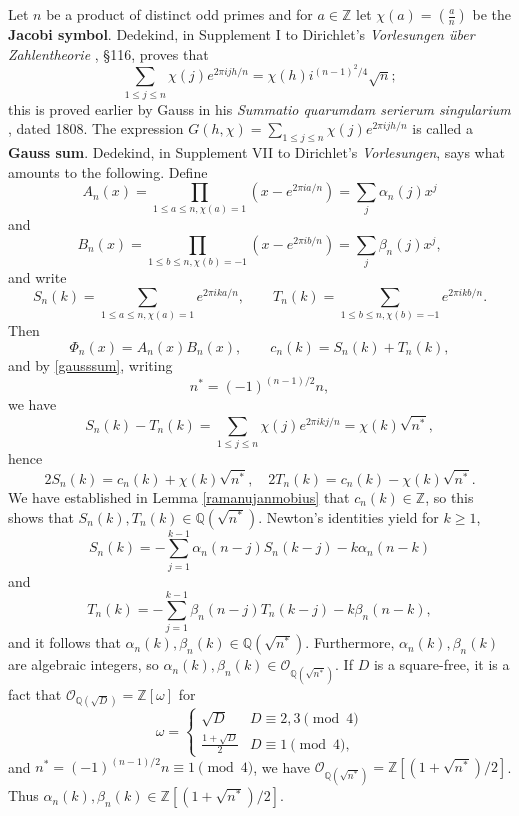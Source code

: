 \documentclass{amsart}
\theoremstyle{definition}
\begin{document}
Let $n$ be a product of distinct odd primes and for $a \in \mathbb{Z}$ let $\chi(a) = \left( \frac{a}{n}\right)$ be the \textbf{Jacobi symbol}. 
Dedekind, in Supplement I to Dirichlet's {\em Vorlesungen \"uber Zahlentheorie}  \cite[pp.~208--210]{dirichlet}, \S 116, proves that
\begin{equation}
\sum_{1 \leq j \leq n} \chi(j) e^{2\pi ij h/n} = \chi(h) i^{(n-1)^2/4} \sqrt{n};
\label{gausssum}
\end{equation}
this is proved earlier by 
Gauss in his {\em Summatio quarumdam serierum singularium} \cite[pp.~9--45]{gaussII}, dated 1808.
The expression $G(h,\chi)=\sum_{1 \leq j \leq n} \chi(j) e^{2\pi ij h/n}$ is called a \textbf{Gauss sum}.
Dedekind, in Supplement VII to Dirichlet's {\em Vorlesungen}, says what amounts to
the following.
Define
\[
A_n(x) = \prod_{1 \leq a \leq n, \chi(a)=1} (x-e^{2\pi ia/n}) = \sum_j \alpha_n(j) x^j
\] 
and
\[
B_n(x) = \prod_{1 \leq b \leq n, \chi(b)=-1} (x-e^{2\pi ib/n}) = \sum_j \beta_n(j) x^j,
\]
and write
\[
S_n(k) =  \sum_{1 \leq a \leq n, \chi(a)=1} e^{2\pi ik a/n},
\qquad T_n(k) = \sum_{1 \leq b \leq n, \chi(b)=-1} e^{2\pi ik b/n}.
\]
Then
\[
\Phi_n(x) = A_n(x) B_n(x),\qquad c_n(k) = S_n(k) + T_n(k),
\]
and by \eqref{gausssum}, writing
\[
n^*=(-1)^{(n-1)/2} n,
\]
we have
\[
S_n(k) - T_n(k) =\sum_{1 \leq j \leq n} \chi(j) e^{2\pi ik j/n} = \chi(k)  \sqrt{n^*},
\]
hence
\[
2S_n(k) = c_n(k) +  \chi(k)   \sqrt{n^*},
\quad
2T_n(k) = c_n(k) -  \chi(k)  \sqrt{n^*}.
\]
We have  established in Lemma \ref{ramanujanmobius} that $c_n(k) \in \mathbb{Z}$, so this shows that
$S_n(k), T_n(k) \in \mathbb{Q}(\sqrt{n^*})$.
Newton's identities yield for $k \geq 1$,
\[
S_n(k) = -\sum_{j=1}^{k-1}  \alpha_n(n-j) S_n(k-j) - k\alpha_n(n-k)
\]
and
\[
T_n(k) = -\sum_{j=1}^{k-1}  \beta_n(n-j) T_n(k-j) - k\beta_n(n-k),
\]
and it follows that $\alpha_n(k),\beta_n(k) \in \mathbb{Q}( \sqrt{n^*})$.
Furthermore, $\alpha_n(k),\beta_n(k)$ are algebraic integers, so
$\alpha_n(k),\beta_n(k) \in \mathcal{O}_{\mathbb{Q}(\sqrt{n^*})}$. 
If $D$ is a square-free, it is a fact \cite[p.~698, \S 15.3]{dummit} that 
$\mathcal{O}_{\mathbb{Q}(\sqrt{D})} = \mathbb{Z}[\omega]$ for 
\[
\omega = \begin{cases}
\sqrt{D}&D \equiv 2,3 \pmod{4}\\
\frac{1+\sqrt{D}}{2}&D \equiv 1 \pmod{4},
\end{cases}
\]
and $n^*=(-1)^{(n-1)/2} n \equiv 1 \pmod{4}$, we have
$\mathcal{O}_{\mathbb{Q}(\sqrt{n^*})} = \mathbb{Z}[(1+\sqrt{n^*})/2]$. Thus
$\alpha_n(k),\beta_n(k) \in  \mathbb{Z}[(1+\sqrt{n^*})/2]$. 
\end{document}
